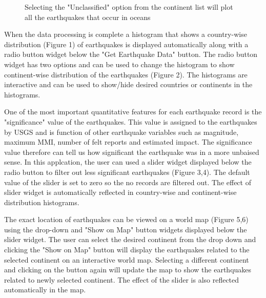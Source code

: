 \documentclass{article}
\begin{document}
		\begin{figure}
			\caption{Selecting the "Unclassified" option from the continent list will plot all the earthquakes that occur in oceans}
		\end{figure}
		
		When the data processing is complete a histogram that shows a country-wise distribution (Figure 1) of earthquakes is displayed automatically along with a radio button widget below the "Get Earthquake Data" button. The radio button widget has two options and can be used to change the histogram to show continent-wise distribution of the earthquakes (Figure 2). The histograms are interactive and can be used to show/hide desired countries or continents in the histograms.
			
		One of the most important quantitative features for each earthquake record is the "significance" value of the earthquakes. This value is assigned to the earthquakes by USGS and is function of other earthquake variables such as magnitude, maximum MMI, number of felt reports and estimated impact. The significance value therefore can tell us how significant the earthquake was in a more unbaised sense. In this applcation, the user can used a slider widget displayed below the radio button to filter out less significant earthquakes (Figure 3,4). The default value of the slider is set to zero so the no records are filtered out. The effect of slider widget is automatically reflected in country-wise and continent-wise distribution histograms.
		
		The exact location of earthquakes can be viewed on a world map (Figure 5,6) using the drop-down and "Show on Map" button widgets displayed below the slider widget. The user can select the desired continent from the drop down and clicking the "Show on Map" button will display the earthquakes related to the selected continent on an interactive world map. Selecting a different continent and clicking on the button again will update the map to show the earthquakes related to newly selected continent. The effect of the slider is also reflected automatically in the map.
		
\end{document}
